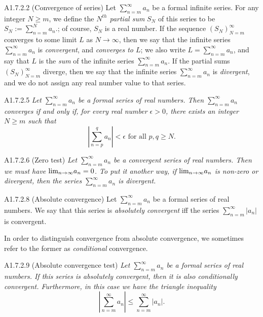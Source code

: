 \begin{definition}{A1.7.2.2}
    (Convergence of series) Let $\sum_{n=m}^{\infty} a_n$ be a formal infinite series.
    For any integer $N \geq m$, we define the \emph{$N^{th}$ partial sum} $S_N$ of
    this series to be $S_N := \sum_{n=m}^{N} a_n$.; of course, $S_N$ is a real number.
    If the sequence $(S_N)_{N=m}^{\infty}$ converges to some limit $L$ as $N \rightarrow \infty$,
    then we say that the infinite series $\sum_{n=m}^{\infty} a_n$ is \emph{convergent},
    and \emph{converges to $L$}; we also write $L = \sum_{n=m}^{\infty} a_n$, and
    say that $L$ is the \emph{sum} of  the infinite series $\sum_{n=m}^{\infty} a_n$.
    If the partial sums $(S_N)_{N=m}^{\infty}$ diverge, then we say that the infinite
    series $\sum_{n=m}^{\infty} a_n$ is \emph{divergent}, and we do not assign any
    real number value to that series.
\end{definition}

\begin{proposition}{A1.7.2.5}
    \emph{Let $\sum_{n=m}^{\infty} a_n$ be a formal series of real numbers. Then
    $\sum_{n=m}^{\infty} a_n$ converges if and only if, for every real number
    $\epsilon > 0$, there exists an integer $N \geq m$ such that
    \begin{equation*}
        |\sum_{n=p}^{q} a_n| < \epsilon \text{ for all $p, q \geq N$}.
    \end{equation*}
    }
\end{proposition}

\begin{corollary}{A1.7.2.6}
    (Zero test) \emph{Let $\sum_{n=m}^{\infty} a_n$ be a convergent series of real
    numbers. Then we must have $\text{lim}_{n \rightarrow \infty}{a_n} = 0$. To put it another way, if
    $\text{lim}_{n \rightarrow \infty}{a_n}$ is non-zero or divergent, then the series $\sum_{n=m}^{\infty} a_n$
    is divergent.}
\end{corollary}

\begin{definition}{A1.7.2.8}
    (Absolute convergence) Let $\sum_{n=m}^{\infty} a_n$ be a formal series of real
    numbers. We say that this series is \emph{absolutely convergent} iff the series
    $\sum_{n=m}^{\infty} |a_n|$ is convergent.

    In order to distinguish convergence from absolute convergence, we sometimes
    refer to the former as \emph{conditional} convergence.
\end{definition}

\begin{proposition}{A1.7.2.9}
    (Absolute convergence test) \emph{Let $\sum_{n=m}^{\infty} a_n$ be a formal series
    of real numbers. If this series is absolutely convergent, then it is also
    conditionally convergent. Furthermore, in this case we have the triangle
    inequality
    \begin{equation*}
        |\sum_{n=m}^{\infty} a_n| \leq \sum_{n=m}^{\infty} |a_n|.
    \end{equation*}}
\end{proposition}

